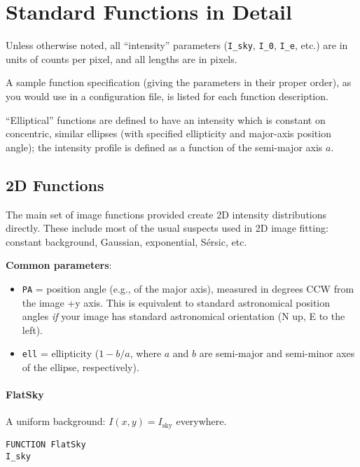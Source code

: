 \documentclass[10pt,a4paper,article]{memoir}
\begin{document}
\newpage

\appendix
\chapter{Standard Functions in Detail}\label{app:functions}

Unless otherwise noted, all ``intensity'' parameters (\texttt{I\_sky},
\texttt{I\_0}, \texttt{I\_e}, etc.) are in units of counts per pixel, and all
lengths are in pixels.

A sample function specification (giving the parameters in their proper order),
as you would use in a configuration file, is listed for each function
description.

``Elliptical'' functions are defined to have an intensity which is constant on
concentric, similar ellipses (with specified ellipticity and major-axis position angle);
the intensity profile is defined as a function of the semi-major axis $a$.


\section{2D Functions}

The main set of image functions provided create 2D intensity distributions
directly. These include most of the usual suspects used in 2D image fitting:
constant background, Gaussian, exponential, S{\'e}rsic, etc.

\medskip

\textbf{Common parameters}: 
\begin{itemize}
\item \texttt{PA} = position angle (e.g., of the major axis), measured in degrees CCW from
the image +y axis. This is equivalent to standard astronomical position angles \textit{if}
your image has standard astronomical orientation (N up, E to the left).
\item \texttt{ell} = ellipticity ($1 - b/a$, where $a$ and $b$ are semi-major and semi-minor
axes of the ellipse, respectively).
\end{itemize}


\subsubsection{FlatSky}

A uniform background: $I(x,y) = I_{\mathrm{sky}}$ everywhere.

\begin{verbatim}
FUNCTION FlatSky
I_sky
\end{verbatim}
\end{document}
